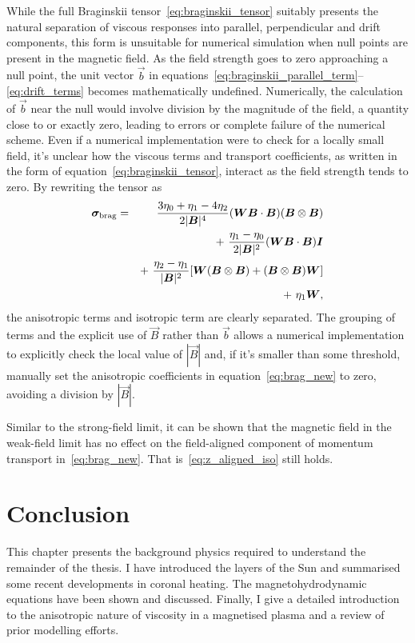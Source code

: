 While the full Braginskii tensor~\ref{eq:braginskii_tensor} suitably presents the natural separation of viscous responses into parallel, perpendicular and drift components, this form is unsuitable for numerical simulation when null points are present in the magnetic field. As the field strength goes to zero approaching a null point, the unit vector $\vec{b}$ in equations~\ref{eq:braginskii_parallel_term}--\ref{eq:drift_terms} becomes mathematically undefined. Numerically, the calculation of $\vec{b}$ near the null would involve division by the magnitude of the field, a quantity close to or exactly zero, leading to errors or complete failure of the numerical scheme. Even if a numerical implementation were to check for a locally small field, it's unclear how the viscous terms and transport coefficients, as written in the form of equation~\ref{eq:braginskii_tensor}, interact as the field strength tends to zero. By rewriting the tensor as
\begin{eqnarray}\label{eq:brag_new}
\ten{\sigma}_{\rm brag} = &&\frac{3\eta_0+\eta_1-4\eta_2}{2|\vec{B}|^4}(\ten{W}\vec{B}\cdot\vec{B})(\vec{B}\otimes\vec{B})\\%
\nonumber
& &+~ \frac{\eta_1-\eta_0}{2|\vec{B}|^2}(\ten{W}\vec{B}\cdot\vec{B})\ten{I}\\%
\nonumber
& &+~ \frac{\eta_2-\eta_1}{|\vec{B}|^2}[\ten{W}(\vec{B}\otimes\vec{B})+(\vec{B}\otimes\vec{B})\ten{W}] \\%
\nonumber
& &+~ \eta_1\ten{W},%
\end{eqnarray}
the anisotropic terms and isotropic term are clearly separated. The grouping of terms and the explicit use of $\vec{B}$ rather than $\vec{b}$ allows a numerical implementation to explicitly check the local value of $|\vec{B}|$ and, if it's smaller than some threshold, manually set the anisotropic coefficients in equation~\ref{eq:brag_new} to zero, avoiding a division by $|\vec{B}|$.

Similar to the strong-field limit, it can be shown that the magnetic field in the weak-field limit has no effect on the field-aligned component of momentum transport in~\ref{eq:brag_new}. That is~\ref{eq:z_aligned_iso} still holds.

\section{Conclusion}

This chapter presents the background physics required to understand the remainder of the thesis. I have introduced the layers of the Sun and summarised some recent developments in coronal heating. The magnetohydrodynamic equations have been shown and discussed. Finally, I give a detailed introduction to the anisotropic nature of viscosity in a magnetised plasma and a review of prior modelling efforts.
